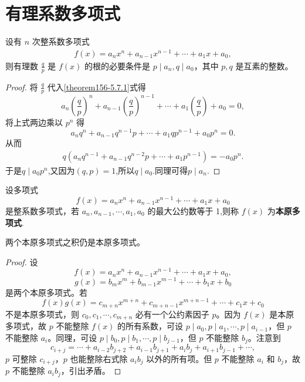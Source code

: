 \documentclass[../../main.tex]{subfiles}
\begin{document}
\section{有理系数多项式}

\begin{theorem}[整数系数多项式有有理根的必要条件]\label{theorem:整数系数多项式有有理根的必要条件}
设有 \( n \) 次整系数多项式
\begin{align}
f(x) = a_n x^n + a_{n-1} x^{n-1} + \cdots + a_1 x + a_0, \label{theorem156-5.7.1}
\end{align}
则有理数 \( \frac{q}{p} \) 是 \( f(x) \) 的根的必要条件是 \( p \mid a_n, q \mid a_0 \)，其中 \( p, q \) 是互素的整数。
\end{theorem}
\begin{proof}
将 \( \frac{q}{p} \) 代入\eqref{theorem156-5.7.1}式得
\[
a_n \left( \frac{q}{p} \right)^n + a_{n-1} \left( \frac{q}{p} \right)^{n-1} + \cdots + a_1 \left( \frac{q}{p} \right) + a_0 = 0,
\]
将上式两边乘以 \( p^n \) 得
\[
a_n q^n + a_{n-1} q^{n-1} p + \cdots + a_1 q p^{n-1} + a_0 p^n = 0.
\]
从而
\begin{align*}
q\left( a_nq^{n-1}+a_{n-1}q^{n-2}p+\cdots +a_1p^{n-1} \right) =-a_0p^n.
\end{align*}
于是$q\mid a_0p^n$,又因为$(q,p)=1$,所以$q\mid a_0$.同理可得$p \mid a_n$.
\end{proof}

\begin{definition}[本原多项式]
设多项式
\[
f(x) = a_n x^n + a_{n-1} x^{n-1} + \cdots + a_1 x + a_0
\]
是整系数多项式，若 \( a_n, a_{n-1}, \cdots, a_1, a_0 \) 的最大公约数等于 1,则称 \( f(x) \) 为\textbf{本原多项式}.
\end{definition}

\begin{lemma}[Gauss引理]\label{lemma:Gauss引理}
两个本原多项式之积仍是本原多项式。
\end{lemma}
\begin{proof}
设
\[
f(x) = a_n x^n + a_{n-1} x^{n-1} + \cdots + a_1 x + a_0,
\]
\[
g(x) = b_m x^m + b_{m-1} x^{m-1} + \cdots + b_1 x + b_0
\]
是两个本原多项式。若
\[
f(x) g(x) = c_{m+n} x^{m+n} + c_{m+n-1} x^{m+n-1} + \cdots + c_1 x + c_0
\]
不是本原多项式，则 \( c_0, c_1, \cdots, c_{m+n} \) 必有一个公约素因子 \( p \)。因为 \( f(x) \) 是本原多项式，故 \( p \) 不能整除 \( f(x) \) 的所有系数，可设 \( p \mid a_0, p \mid a_1, \cdots, p \mid a_{i-1} \)，但 \( p \) 不能整除 \( a_i \)。同理，可设 \( p \mid b_0, p \mid b_1, \cdots, p \mid b_{j-1} \)，但 \( p \) 不能整除 \( b_j \)。注意到
\[
c_{i+j} = \cdots + a_{i-2} b_{j+2} + a_{i-1} b_{j+1} + a_i b_j + a_{i+1} b_{j-1} + \cdots,
\]
\( p \) 可整除 \( c_{i+j} \)，\( p \) 也能整除右式除 \( a_i b_j \) 以外的所有项。但 \( p \) 不能整除 \( a_i \) 和 \( b_j \)，故 \( p \) 不能整除 \( a_i b_j \)，引出矛盾。
\end{proof}
\end{document}
